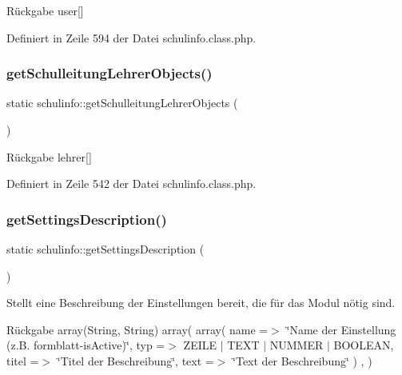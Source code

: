 \begin{DoxyReturn}{Rückgabe}
user\mbox{[}\mbox{]} 
\end{DoxyReturn}


Definiert in Zeile 594 der Datei schulinfo.\+class.\+php.

\mbox{\label{classschulinfo_a151fa5931f4f317b6717f7238e9222ad}} 
\subsubsection{\texorpdfstring{get\+Schulleitung\+Lehrer\+Objects()}{getSchulleitungLehrerObjects()}}
{\footnotesize\ttfamily static schulinfo\+::get\+Schulleitung\+Lehrer\+Objects (\begin{DoxyParamCaption}{ }\end{DoxyParamCaption})\hspace{0.3cm}{\ttfamily [static]}}

\begin{DoxyReturn}{Rückgabe}
lehrer\mbox{[}\mbox{]} 
\end{DoxyReturn}


Definiert in Zeile 542 der Datei schulinfo.\+class.\+php.

\mbox{\label{classschulinfo_a14e41f9cafeb48e286092850a0a900fd}} 
\subsubsection{\texorpdfstring{get\+Settings\+Description()}{getSettingsDescription()}}
{\footnotesize\ttfamily static schulinfo\+::get\+Settings\+Description (\begin{DoxyParamCaption}{ }\end{DoxyParamCaption})\hspace{0.3cm}{\ttfamily [static]}}

Stellt eine Beschreibung der Einstellungen bereit, die für das Modul nötig sind. \begin{DoxyReturn}{Rückgabe}
array(\+String, String) array( array( \textquotesingle{}name\textquotesingle{} =$>$ \char`\"{}\+Name der Einstellung (z.\+B. formblatt-\/is\+Active)\char`\"{}, \textquotesingle{}typ\textquotesingle{} =$>$ Z\+E\+I\+LE $\vert$ T\+E\+XT $\vert$ N\+U\+M\+M\+ER $\vert$ B\+O\+O\+L\+E\+AN, \textquotesingle{}titel\textquotesingle{} =$>$ \char`\"{}\+Titel der Beschreibung\char`\"{}, \textquotesingle{}text\textquotesingle{} =$>$ \char`\"{}\+Text der Beschreibung\char`\"{} ) , ) 
\end{DoxyReturn}


